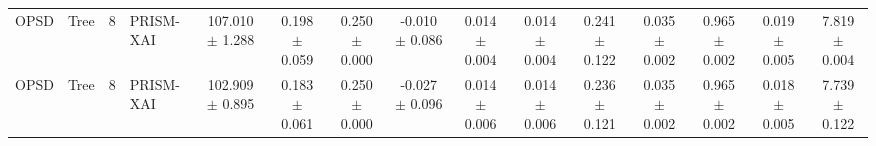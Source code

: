 \begin{table}[t]
\begin{tabular}{llllccccccccccc}
OPSD & Tree & 8 & PRISM-XAI & 107.010 $\pm$ 1.288 & 0.198 $\pm$ 0.059 & 0.250 $\pm$ 0.000 & -0.010 $\pm$ 0.086 & 0.014 $\pm$ 0.004 & 0.014 $\pm$ 0.004 & 0.241 $\pm$ 0.122 & 0.035 $\pm$ 0.002 & 0.965 $\pm$ 0.002 & 0.019 $\pm$ 0.005 & 7.819 $\pm$ 0.004 \\
OPSD & Tree & 8 & PRISM-XAI & 102.909 $\pm$ 0.895 & 0.183 $\pm$ 0.061 & 0.250 $\pm$ 0.000 & -0.027 $\pm$ 0.096 & 0.014 $\pm$ 0.006 & 0.014 $\pm$ 0.006 & 0.236 $\pm$ 0.121 & 0.035 $\pm$ 0.002 & 0.965 $\pm$ 0.002 & 0.018 $\pm$ 0.005 & 7.739 $\pm$ 0.122 \\
\bottomrule
\end{tabular}
\end{table}
